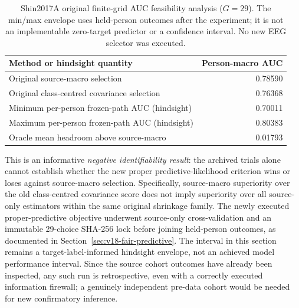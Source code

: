 \begin{table}[tb]
\centering
\small
\caption{Shin2017A original finite-grid AUC feasibility analysis
($G=29$). The min/max envelope uses held-person outcomes after
the experiment; it is not an implementable zero-target predictor
or a confidence interval. No new EEG selector was executed.}
\label{tab:v17-feasible-envelope}
\begin{tabular}{lr}
\toprule
Method or hindsight quantity & Person-macro AUC\\
\midrule
Original source-macro selection & 0.78590\\
Original class-centred covariance selection & 0.76368\\
Minimum per-person frozen-path AUC (hindsight) & 0.70011\\
Maximum per-person frozen-path AUC (hindsight) & 0.80383\\
Oracle mean headroom above source-macro & 0.01793\\
\bottomrule
\end{tabular}
\end{table}

This is an informative \emph{negative identifiability result}:
the archived trials alone cannot establish whether the
new proper predictive-likelihood criterion wins or loses
against source-macro selection. Specifically, source-macro
superiority over the old class-centred covariance score
does not imply superiority over all source-only estimators
within the same original shrinkage family. The newly executed
proper-predictive objective underwent source-only
cross-validation and an immutable 29-choice SHA-256 lock before
joining held-person outcomes, as documented in
Section~\ref{sec:v18-fair-predictive}. The interval in this
section remains a target-label-informed hindsight envelope,
not an achieved model performance interval. Since the source cohort outcomes
have already been inspected, any such run is retrospective,
even with a correctly executed information firewall; a
genuinely independent pre-data cohort would be needed
for new confirmatory inference.
